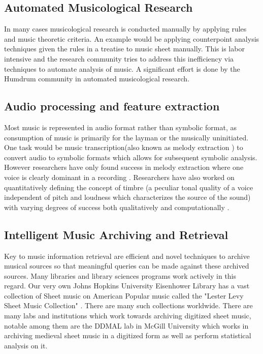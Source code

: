 \subsection{Automated Musicological Research}

\noindent In many cases musicological research is conducted manually by applying rules and music theoretic criteria. An example would be applying counterpoint analysis techniques given the rules in a treatise \cite{theorytreatise} to music sheet manually. This is labor intensive and the research community tries to address this inefficiency via techniques to automate analysis of music. A significant effort is done by the Humdrum community \cite{humdrum} in automated musicological research. 

\subsection{Audio processing and feature extraction}

\noindent Most music is represented in audio format rather than symbolic format, as consumption of music is primarily for the layman or the musically uninitiated. One task would be music transcription(also known as melody extraction \cite{melextract}) to convert audio to symbolic formats which allows for subsequent symbolic analysis. However researchers have only found success in melody extraction where one voice is clearly dominant in a recording \cite{melextract}. Researchers have also worked on quantitatively defining the concept of timbre (a peculiar tonal quality of a voice independent of pitch and loudness which characterizes the source of the sound) with varying degrees of success both qualitatively \cite{timbrequal} and computationally \cite{musiclisteningthesis}. 

\subsection{Intelligent Music Archiving and Retrieval}

\noindent Key to music information retrieval are efficient and novel techniques to archive musical sources so that meaningful queries can be made against these archived sources. Many libraries and library sciences programs work actively in this regard. Our very own Johns Hopkins University Eisenhower Library has a vast collection of Sheet music on American Popular music called the "Lester Levy Sheet Music Collection" \cite{Levy:Collection:Online} . There are many such collections worldwide. There are many labs and institutions which work towards archiving digitized sheet music, notable among them are the DDMAL lab in McGill University \cite{DDMAL} which works in archiving medieval sheet music in a digitized form as well as perform statistical analysis on it. 

